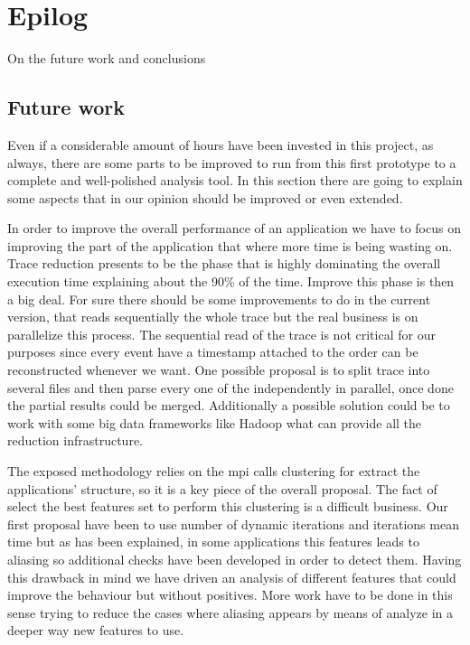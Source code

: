 \chapter{Epilog}

On the future work and conclusions

\section{Future work}

Even if a considerable amount of hours have been invested in this project, as 
always, there are some parts to be improved to run from this first prototype to
a complete and well-polished analysis tool. In this section there are going to
explain some aspects that in our opinion should be improved or even extended.


In order to improve the 
overall performance of an application we have to focus on improving the part of
the application that where more time is being wasting on. Trace reduction presents
to be the phase that is highly dominating the overall execution time explaining 
about the 90\% of the time. Improve this phase is then a big deal. For sure
there should be some improvements to do in the current version, that reads
sequentially the whole trace but the real business is on parallelize this
process. The sequential read of the trace is not critical for our purposes since
every event have a timestamp attached to the order can be reconstructed whenever
we want. One possible proposal is to split trace into several files and then
parse every one of the independently in parallel, once done the partial results 
could be merged. Additionally a possible solution could be to work with some
big data frameworks like Hadoop what can provide all the reduction
infrastructure.

The exposed methodology relies on the mpi calls clustering for extract the
applications' structure, so it is a key piece of the overall proposal. The fact
of select the best features set to perform this clustering is a difficult
business. Our first proposal have been to use number of dynamic iterations and
iterations mean time but as has been explained, in some applications this
features leads to aliasing so additional checks have been developed in order to
detect them. Having this drawback in mind we have driven an analysis of different
features that could improve the behaviour but without positives. More work have 
to be done in this sense trying to reduce the cases where aliasing appears by
means of analyze in a deeper way new features to use.

